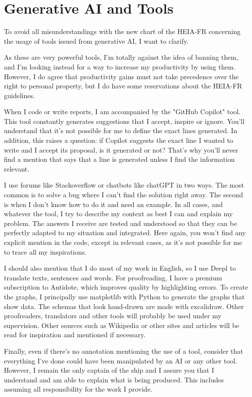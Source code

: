 \chapter{Generative AI and Tools}
\label{ch:tools}

To avoid all misunderstandings with the new chart of the HEIA-FR concerning the
usage of tools issued from generative AI, I want to clarify.

As these are very powerful tools, I'm totally against the idea of banning them,
and I'm looking instead for a way to increase my productivity by using them.
However, I do agree that productivity gains must not take precedence over the
right to personal property, but I do have some reservations about the HEIA-FR
guidelines.

When I code or write reports, I am accompanied by the "GitHub Copilot" tool.
This tool constantly generates suggestions that I accept, inspire or ignore.
You'll understand that it's not possible for me to define the exact lines
generated.
In addition, this raises a question: if Copilot suggests the exact line I wanted
to write and I accept its proposal, is it generated or not?
That's why you'll never find a mention that says that a line is generated unless
I find the information relevant.

I use forums like Stackoverflow or chatbots like chatGPT in two ways.
The most common is to solve a bug where I can't find the solution right away.
The second is when I don't know how to do it and need an example.
In all cases, and whatever the tool, I try to describe my context as best I can
and explain my problem.
The answers I receive are tested and understood so that they can be perfectly
adapted to my situation and integrated.
Here again, you won't find any explicit mention in the code, except in relevant
cases, as it's not possible for me to trace all my inspirations.

I should also mention that I do most of my work in English, so I use Deepl to
translate texts, sentences and words.
For proofreading, I have a premium subscription to Antidote, which improves
quality by highlighting errors.
To create the graphs, I principally use matplotlib with Python to generate the
graphs that show data.
The schemas that look hand-drawn are made with excalidraw.
Other proofreaders, translators and other tools will probably be used under my
supervision.
Other sources such as Wikipedia or other sites and articles will be read for
inspiration and mentioned if necessary.

Finally, even if there's no annotation mentioning the use of a tool, consider
that everything I've done could have been manipulated by an AI or any other tool.
However, I remain the only captain of the ship and I assure you that I
understand and am able to explain what is being produced.
This includes assuming all responsibility for the work I provide.

